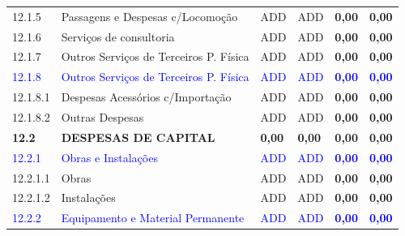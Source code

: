 \documentclass[a4paper,12pt]{article}
\begin{document}
\begin{table}[h]
{\begin{tabular}{|l|l|l|l|l|l|}
    \rowcolor{Gainsboro!60} 
    12.1.5 & 
    Passagens e Despesas c/Locomoção & 
    ADD & 
    ADD & 
    \textbf{0,00} &
    \textbf{0,00} \\    

    12.1.6 & 
    Serviços de consultoria & 
    ADD & 
    ADD &
    \textbf{0,00} &
    \textbf{0,00} \\ 

    \rowcolor{Gainsboro!60} 
    12.1.7 & 
    Outros Serviços de Terceiros P. Física & 
    ADD & 
    ADD & 
    \textbf{0,00} &
    \textbf{0,00} \\ \hline 

    \textcolor{blue}{12.1.8} &
    \textcolor{blue}{Outros Serviços de Terceiros P. Física} & 
    \textcolor{blue}{ADD} & 
    \textcolor{blue}{ADD} &  
    \textcolor{blue}{\textbf{0,00}} &
    \textcolor{blue}{\textbf{0,00}} \\  

    \rowcolor{Gainsboro!60} 
    12.1.8.1 & 
    Despesas Acessórios c/Importação & 
    ADD & 
    ADD & 
    \textbf{0,00} &
    \textbf{0,00} \\ 

    12.1.8.2 & 
    Outras Despesas & 
    ADD & 
    ADD &
    \textbf{0,00} &
    \textbf{0,00} \\ \hline
    
    \rowcolor{blue!40} \textbf{12.2} & 
    \textbf{DESPESAS DE CAPITAL} & 
    \textbf{0,00} & 
    \textbf{0,00} & 
    \textbf{0,00} & 
    \textbf{0,00} \\ \hline

    \rowcolor{Gainsboro!60} 
    \textcolor{blue}{12.2.1} &
    \textcolor{blue}{Obras e Instalações} & 
    \textcolor{blue}{ADD} & 
    \textcolor{blue}{ADD} &  
    \textcolor{blue}{\textbf{0,00}} &
    \textcolor{blue}{\textbf{0,00}} \\  

    12.2.1.1 & 
    Obras & 
    ADD & 
    ADD &
    \textbf{0,00} &
    \textbf{0,00} \\ 

    \rowcolor{Gainsboro!60}
    12.2.1.2 & 
    Instalações & 
    ADD & 
    ADD &
    \textbf{0,00} &
    \textbf{0,00} \\ \hline

    \textcolor{blue}{12.2.2} &
    \textcolor{blue}{Equipamento e Material Permanente} & 
    \textcolor{blue}{ADD} & 
    \textcolor{blue}{ADD} &  
    \textcolor{blue}{\textbf{0,00}} &
    \textcolor{blue}{\textbf{0,00}} \\  


\end{tabular}}
\end{table}
\end{document}

